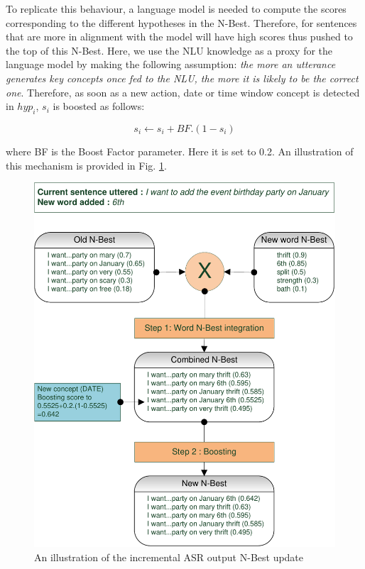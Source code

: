         
        To replicate this behaviour, a language model is needed to compute the scores corresponding to the different hypotheses in the N-Best. Therefore, for sentences that are more in alignment with the model will have high scores thus pushed to the top of this N-Best. Here, we use the NLU knowledge as a proxy for the language model by making the following assumption: \textit{the more an utterance generates key concepts once fed to the NLU, the more it is likely to be the correct one}. Therefore, as soon as a new action, date or time window concept is detected in $hyp_i$, $s_i$ is boosted as follows:
        
        	$$ s_i \leftarrow s_i + BF.(1 - s_i) $$
            
      	where BF is the Boost Factor parameter. Here it is set to 0.2. An illustration of this mechanism is provided in Fig. \ref{fig:asrsimu}.
        
        \begin{figure}[hb]
          \centering
          \includegraphics[scale=1]{figures/ASRSimu.pdf}
          \caption{An illustration of the incremental ASR output N-Best update}
          \label{fig:asrsimu}
        \end{figure}
    

